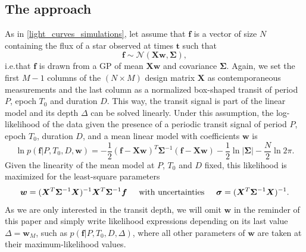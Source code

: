 \documentclass[modern]{aastex631}
\begin{document}
\subsection{The approach}\label{approach}
As in \autoref{light_curves_simulations}, let assume that $\bm{f}$ is a vector of size $N$ containing the flux of a star observed at times $\bm{t}$ such that
\begin{equation*}
    \bm{f} \sim \mathcal{N}(\bm{X w}, \bm{\Sigma}),
\end{equation*}
i.e.\;that $\bm{f}$ is drawn from a GP of mean $\bm{Xw}$ and covariance $\bm{\Sigma}$. Again, we set the first $M-1$ columns of the $(N\times M)$ design matrix $\bm{X}$ as contemporaneous measurements and the last column as a normalized box-shaped transit of period $P$, epoch $T_0$ and duration $D$. This way, the transit signal is part of the linear model and its depth $\Delta$ can be solved linearly. Under this assumption, the log-likelihood of the data given the presence of a periodic transit signal of period $P$, epoch $T_0$, duration $D$, and a mean linear model with coefficients $\bm{w}$ is \citep{Rasmussen2005}
\begin{equation} \label{eq:linear_search_ll}
    \ln p(\bm{f} \vert P, T_0, D, \bm{w}) = -\frac{1}{2}(\bm{f}-\bm{Xw})^T\bm{\Sigma}^{-1}(\bm{f}-\bm{Xw}) -  \frac{1}{2}\ln\vert\bm{\Sigma}\vert - \frac{N}{2}\ln 2\pi.
\end{equation}
Given the linearity of the mean model at $P$, $T_0$ and $D$ fixed, this likelihood is maximized for the least-square parameters
\begin{equation}\label{eq:ls}
    \bm{w} = (\bm{X}^T\bm{\Sigma}^{-1}\bm{X})^{-1}\bm{X}^T\bm{\Sigma}^{-1}\bm{f} \hspace{0.5cm} \text{with  uncertainties} \hspace{0.5cm} \bm{\sigma} = (\bm{X}^T\bm{\Sigma}^{-1}\bm{X})^{-1}.
\end{equation}
As we are only interested in the transit depth, we will omit $\bm{w}$ in the reminder of this paper and simply write likelihood expressions depending on its last value $\Delta=\bm{w}_M$, such as $p(\bm{f} \vert P, T_
0, D, \Delta)$, where all other parameters of $\bm{w}$ are taken at their maximum-likelihood values. \\\\
\end{document}
